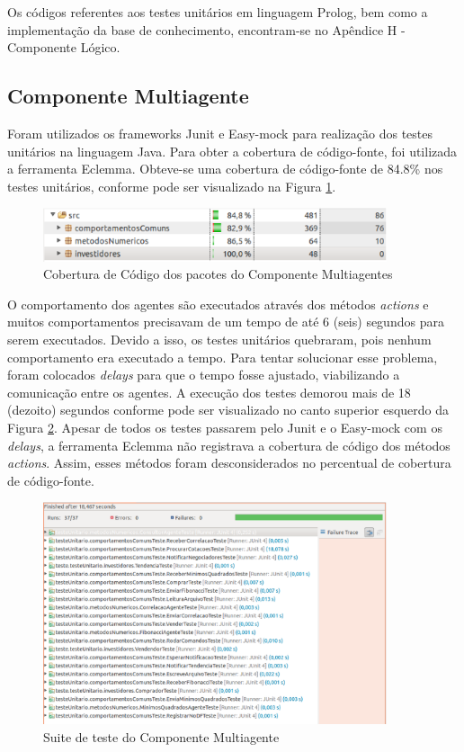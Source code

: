 Os códigos referentes aos testes unitários em linguagem Prolog, bem como a implementação da base de conhecimento, encontram-se no Apêndice H - Componente Lógico.

\subsection{Componente Multiagente}
Foram utilizados os frameworks Junit e Easy-mock para realização dos testes unitários na linguagem Java. Para obter a cobertura de código-fonte, foi utilizada a ferramenta Eclemma. Obteve-se uma cobertura de código-fonte de 84.8\% nos testes unitários, conforme pode ser visualizado na Figura \ref{eclemmaSMA}. 

\begin{figure}[H]
\centering
\includegraphics[width=0.9\textwidth]{figuras/eclemmaSMA}
\caption{Cobertura de Código dos pacotes do Componente Multiagentes}
\label{eclemmaSMA}
\end{figure}

O comportamento dos agentes são executados através dos métodos \textit{actions} e muitos  comportamentos precisavam de um tempo de até 6 (seis) segundos para serem executados. Devido a isso, os testes unitários quebraram, pois nenhum comportamento era executado a tempo. Para tentar solucionar esse problema, foram colocados \textit{delays} para que o tempo fosse ajustado, viabilizando a comunicação entre os agentes. A execução dos testes demorou mais de 18 (dezoito) segundos conforme pode ser visualizado no  canto superior esquerdo da Figura \ref{eclemmaTodasClasses}. Apesar de todos os testes passarem pelo Junit e o Easy-mock com os \textit{delays}, a ferramenta Eclemma não registrava a cobertura de código dos métodos \textit{actions}. Assim, esses métodos foram desconsiderados no percentual de cobertura de código-fonte.

\begin{figure}[H]
\centering
\includegraphics[width=0.9\textwidth]{figuras/eclemmaTodasClasses}
\caption{Suite de teste do Componente Multiagente}
\label{eclemmaTodasClasses}
\end{figure}

